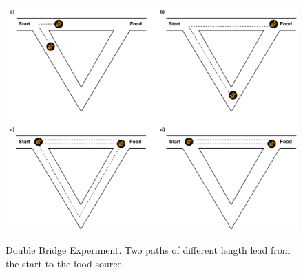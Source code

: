 \begin{figure}[h]
	\begin{centering}
		{\includegraphics[scale=0.8]{figures/background/aco_double_bridge.pdf}}
		\caption{Double Bridge Experiment. Two paths of different length lead from the start to the food source.}
		\label{fig:double_bridge}
	\end{centering}
\end{figure}
